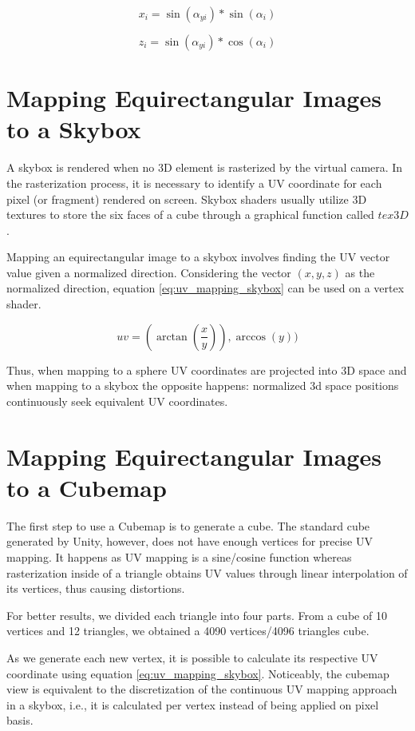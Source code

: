 \documentclass[12pt]{article}
\begin{document}
\begin{equation}
x_{i} = \sin(\alpha_{yi}) * \sin(\alpha_i)
\label{equation9}
\end{equation}

\begin{equation}
z_{i} = \sin(\alpha_{yi}) * \cos(\alpha_i)
\label{equation10}
\end{equation}

\section{Mapping Equirectangular Images to a Skybox}
A skybox is rendered when no 3D element is rasterized by the virtual camera. In the rasterization process, it is necessary to identify a UV coordinate for each pixel (or fragment) rendered on screen. Skybox shaders usually utilize 3D textures to store the six faces of a cube through a graphical function called $tex3D$.

Mapping an equirectangular image to a skybox involves finding the UV vector value given a normalized direction. Considering the vector $(x, y, z)$ as the normalized direction, equation \ref{eq:uv_mapping_skybox} can be used on a vertex shader.

\begin{equation}
uv = (\arctan(\frac{x}{y})), \arccos(y))
\label{eq:uv_mapping_skybox}
\end{equation}

Thus, when mapping to a sphere UV coordinates are projected into 3D space and when mapping to a skybox the opposite happens: normalized 3d space positions continuously seek equivalent UV coordinates.

\section{Mapping Equirectangular Images to a Cubemap}
The first step to use a Cubemap is to generate a cube. The standard cube generated by Unity, however, does not have enough vertices for precise UV mapping. It happens as UV mapping is a sine/cosine function whereas rasterization inside of a triangle obtains UV values through linear interpolation of its vertices, thus causing distortions.

For better results, we divided each triangle into four parts. From a cube of 10 vertices and 12 triangles, we obtained a 4090 vertices/4096 triangles cube.

As we generate each new vertex, it is possible to calculate its respective UV coordinate using equation \ref{eq:uv_mapping_skybox}. Noticeably, the cubemap view is equivalent to the discretization of the continuous UV mapping approach in a skybox, i.e., it is calculated per vertex instead of being applied on pixel basis.
\end{document}
